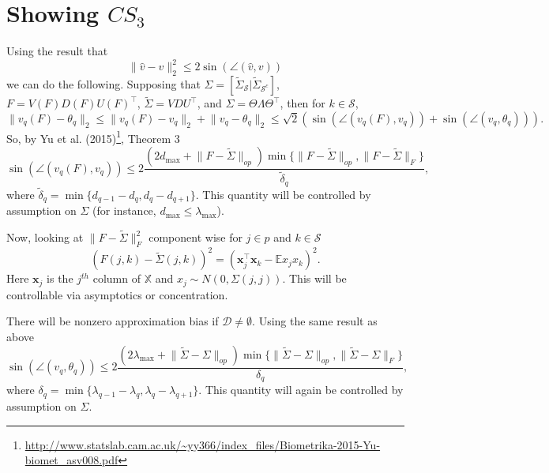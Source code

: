 \documentclass[11pt]{article}
\newcommand{\E}{\mathbb{E}}
\newcommand{\norm}[1]{\lVert #1 \rVert}
\newcommand{\X}{\mathbb{X}}
\renewcommand{\S}{\mathcal{S}}
\newcommand{\D}{\mathcal{D}}
\newcommand{\x}{\mathbf{x}}
\begin{document}
\section{Showing $CS_3$}
Using the result that
\[
\norm{\hat{v} - v}_2^2 \leq 2 \sin(\angle (\hat{v},v) )
\]
we can do the following.  Supposing that 
$\Sigma = [\tilde{\Sigma}_\S | \tilde{\Sigma}_{\S^c}]$, $F = V(F) D(F) U(F)^{\top}$, $\tilde{\Sigma} = V DU^{\top}$, and $\Sigma = \Theta \Lambda \Theta^{\top}$, then for $k \in \S$,
\[
\norm{v_q(F) - \theta_q}_2 \leq  \norm{v_q(F) - v_q}_2 + \norm{v_q - \theta_q}_2 \leq \sqrt{2}\left( \sin(\angle (v_q(F), v_q)) + \sin(\angle (v_q,\theta_q))\right).
\]
So, by Yu et al. (2015)\footnote{\url{http://www.statslab.cam.ac.uk/~yy366/index_files/Biometrika-2015-Yu-biomet_asv008.pdf}}, Theorem 3
\[
 \sin(\angle (v_q(F), v_q)) 
 \leq 
 2\frac{(2d_{\max} + \norm{F - \tilde{\Sigma}}_{op})\min\{ \norm{F - \tilde{\Sigma}}_{op}, \norm{F - \tilde{\Sigma}}_{F}\}}{\tilde{\delta}_q},
\]
where $\tilde{\delta}_q = \min\{d_{q-1} - d_q, d_{q} - d_{q+1}\}$.  This quantity will be controlled by assumption on $\Sigma$ (for instance, $d_{\max} \leq \lambda_{\max}$).

Now, looking at $\norm{F - \tilde{\Sigma}}_{F}^2$ component wise for $j \in p$ and $k \in \S$
\[
(F(j,k) - \tilde{\Sigma}(j,k))^2 = (\x_j^{\top}\x_k - \E x_jx_k)^2.
\]
Here $\x_j$ is the $j^{th}$ column of $\X$ and $x_j \sim N(0,\Sigma(j,j))$.  This will be controllable via asymptotics or concentration. 

There will be nonzero approximation bias if $\D \neq \emptyset$.  Using the same result as above
\[
\sin(\angle (v_q,\theta_q))
\leq 
2\frac{(2\lambda_{\max} + \norm{ \tilde{\Sigma} - \Sigma}_{op})\min\{\norm{\tilde{\Sigma} - \Sigma}_{op}, \norm{\tilde{\Sigma} - \Sigma}_{F}\}}{\delta_q},
\]
where $\delta_q = \min\{\lambda_{q-1} - \lambda_q, \lambda_{q} - \lambda_{q+1}\}$.  This quantity will again be controlled by assumption on $\Sigma$. 
\end{document}

